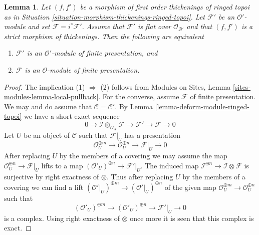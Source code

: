 \documentclass[10pt,a4paper]{amsart}
\theoremstyle{plain}
\newtheorem{lemma}[subsection]{Lemma}
\theoremstyle{definition}
\theoremstyle{remark}
\numberwithin{equation}{subsection}
\begin{document}
\begin{lemma}
\label{lemma-deform-fp-module-ringed-topoi}
Let $(f, f')$ be a morphism of first order thickenings of ringed topoi
as in Situation \ref{situation-morphism-thickenings-ringed-topoi}.
Let $\mathcal{F}'$ be an $\mathcal{O}'$-module
and set $\mathcal{F} = i^*\mathcal{F}'$.
Assume that $\mathcal{F}'$ is flat over $\mathcal{O}_{\mathcal{B}'}$
and that $(f, f')$ is a strict morphism of thickenings.
Then the following are equivalent
\begin{enumerate}
\item $\mathcal{F}'$ is an $\mathcal{O}'$-module of finite presentation, and
\item $\mathcal{F}$ is an $\mathcal{O}$-module of finite presentation.
\end{enumerate}
\end{lemma}

\begin{proof}
The implication (1) $\Rightarrow$ (2) follows from
Modules on Sites, Lemma \ref{sites-modules-lemma-local-pullback}.
For the converse, assume $\mathcal{F}$ of finite presentation.
We may and do assume that $\mathcal{C} = \mathcal{C}'$.
By Lemma \ref{lemma-deform-module-ringed-topoi} we have a short exact sequence
$$
0 \to \mathcal{I} \otimes_{\mathcal{O}_X} \mathcal{F} \to
\mathcal{F}' \to \mathcal{F} \to 0
$$
Let $U$ be an object of $\mathcal{C}$ such that $\mathcal{F}|_U$ has a
presentation
$$
\mathcal{O}_U^{\oplus m} \to \mathcal{O}_U^{\oplus n} \to \mathcal{F}|_U \to 0
$$
After replacing $U$ by the members of a covering we may assume the
map $\mathcal{O}_U^{\oplus n} \to \mathcal{F}|_U$ lifts to a map
$(\mathcal{O}'_U)^{\oplus n} \to \mathcal{F}'|_U$. The induced map
$\mathcal{I}^{\oplus n} \to \mathcal{I} \otimes \mathcal{F}$ is
surjective by right exactness of $\otimes$. Thus after replacing $U$
by the members of a covering we can find a lift
$(\mathcal{O}'|_U)^{\oplus m} \to (\mathcal{O}'|_U)^{\oplus n}$
of the given map $\mathcal{O}_U^{\oplus m} \to \mathcal{O}_U^{\oplus n}$
such that
$$
(\mathcal{O}'_U)^{\oplus m} \to (\mathcal{O}'_U)^{\oplus n} \to
\mathcal{F}'|_U \to 0
$$
is a complex. Using right exactness of $\otimes$ once more it is seen
that this complex is exact.
\end{proof}
\end{document}

